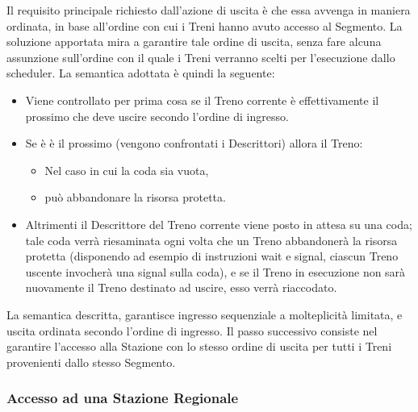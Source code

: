 \begin{description}
			Il requisito principale richiesto dall'azione di uscita è che essa avvenga in maniera ordinata, in base all'ordine con cui i Treni hanno avuto accesso al Segmento. La soluzione apportata mira a garantire tale ordine di uscita, senza fare alcuna assunzione sull'ordine con il quale i Treni verranno scelti per l'esecuzione dallo scheduler. La semantica adottata è quindi la seguente:
			\begin{itemize}
				 \item Viene controllato per prima cosa se il Treno corrente è effettivamente il prossimo che deve uscire secondo l'ordine di ingresso.
				 \item Se è è il prossimo (vengono confrontati i Descrittori) allora il Treno:
				 	\begin{itemize} 
				 		\item Nel caso in cui la coda sia vuota, 
				 		\item può abbandonare la risorsa protetta.
				 	\end{itemize} 
				 \item Altrimenti il Descrittore del Treno corrente viene posto in attesa su una coda; tale coda verrà riesaminata ogni volta che un Treno abbandonerà la risorsa protetta (disponendo ad esempio di instruzioni wait e signal, ciascun Treno uscente invocherà una signal sulla coda), e se il Treno in esecuzione non sarà nuovamente il Treno destinato ad uscire, esso verrà riaccodato. 
			\end{itemize}
		\end {description}  
	
	La semantica descritta, garantisce ingresso sequenziale a molteplicità limitata, e uscita ordinata secondo l'ordine di ingresso. Il passo successivo consiste nel garantire l'accesso alla Stazione con lo stesso ordine di uscita per tutti i Treni provenienti dallo stesso Segmento.


		\subsubsection{Accesso ad una Stazione Regionale}\label{subsubsec:regional_station_access}
		
